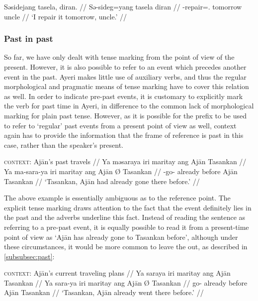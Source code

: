\ex\begingl
	\gla Səsidejang tasela, diran. //
	\glb Sə-sideg=yang tasela diran //
	\glc \Fut{}-repair=\Fsg{}.\Aarg{} tomorrow uncle //
	\glft `I  repair it tomorrow, uncle.' //
\endgl\xe


\subsubsection{Past in past}

So far, we have only dealt with tense marking from the point of view of the
present. However, it is also possible to refer to an event which precedes
another event in the past. Ayeri makes little use of auxiliary verbs, and thus
the regular morphological and pragmatic means of tense marking have to cover
this relation as well. In order to indicate pre-past events, it is customary to
explicitly mark the verb for past time in Ayeri, in difference to the common
lack of morphological marking for plain past tense. However, as it is possible
for the  prefix to be used to refer to `regular' past events from
a present point of view as well, context again has to provide the information
that the frame of reference is past in this case, rather than the speaker's
present.

\ex
\begingl
	\glpreamble \textsc{context:} Ajān's past travels //
	\gla Ya məsaraya iri maritay ang Ajān {} Tasankan //
	\glb Ya ma-sara-ya iri maritay ang Ajān Ø Tasankan //
	\glc \LocT{} \Pst{}-go-\TsgM{} already before \Aarg{} Ajān \Top{} %
		Tasankan //
	\glft `Tasankan, Ajān had already gone there before.' //
\endgl
\xe

The above example is essentially ambiguous as to the reference point. The
explicit tense marking draws attention to the fact that the event definitely
lies in the past and the adverbs underline this fact. Instead of reading the
sentence as referring to a pre-past event, it is equally possible to read it
from a present-time point of view as `Ajān has already gone to Tasankan
before', although under these circumstances, it would be more common to leave
the  out, as described in \autoref{subsubsec:past}:

\ex
\begingl
	\glpreamble \textsc{context:} Ajān's current traveling plans //
	\gla Ya saraya iri maritay ang Ajān {} Tasankan //
	\glb Ya sara-ya iri maritay ang Ajān Ø Tasankan //
	\glc \LocT{} go-\TsgM{} already before \Aarg{} Ajān \Top{} %
		Tasankan //
	\glft `Tasankan, Ajān already went there before.' //
\endgl
\xe

